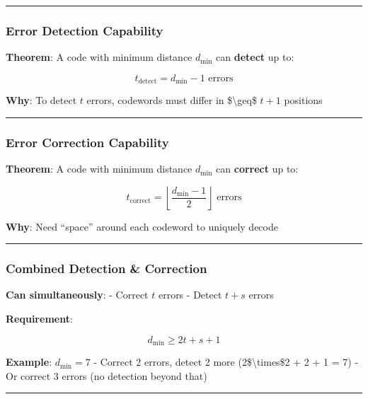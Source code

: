 \begin{center}\rule{0.5\linewidth}{0.5pt}\end{center}

\subsubsection{Error Detection
Capability}\label{error-detection-capability}

\textbf{Theorem}: A code with minimum distance \(d_{\min}\) can
\textbf{detect} up to:

\[
t_{\text{detect}} = d_{\min} - 1 \text{ errors}
\]

\textbf{Why}: To detect \(t\) errors, codewords must differ in
\$\textbackslash geq\$ \(t+1\) positions

\begin{center}\rule{0.5\linewidth}{0.5pt}\end{center}

\subsubsection{Error Correction
Capability}\label{error-correction-capability}

\textbf{Theorem}: A code with minimum distance \(d_{\min}\) can
\textbf{correct} up to:

\[
t_{\text{correct}} = \left\lfloor \frac{d_{\min} - 1}{2} \right\rfloor \text{ errors}
\]

\textbf{Why}: Need ``space'' around each codeword to uniquely decode

\begin{center}\rule{0.5\linewidth}{0.5pt}\end{center}

\subsubsection{Combined Detection \&
Correction}\label{combined-detection-correction}

\textbf{Can simultaneously}: - Correct \(t\) errors - Detect \(t + s\)
errors

\textbf{Requirement}:

\[
d_{\min} \geq 2t + s + 1
\]

\textbf{Example}: \(d_{\min} = 7\) - Correct 2 errors, detect 2 more
(2\$\textbackslash times\$2 + 2 + 1 = 7) - Or correct 3 errors (no
detection beyond that)

\begin{center}\rule{0.5\linewidth}{0.5pt}\end{center}

